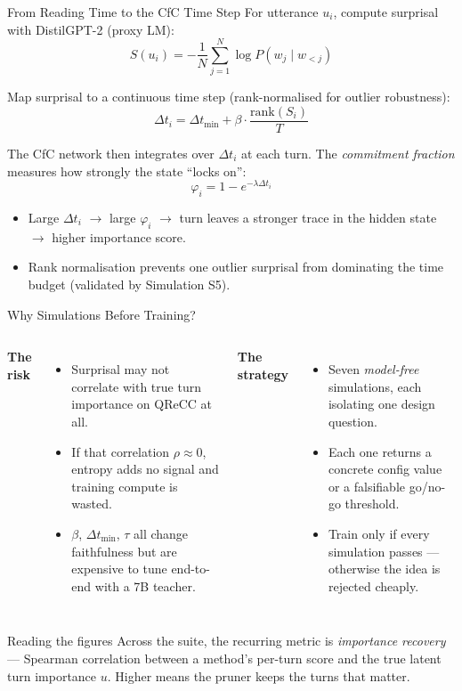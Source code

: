 \documentclass[aspectratio=169,11pt]{beamer}
\begin{document}
\begin{frame}{From Reading Time to the CfC Time Step}
  \small
  For utterance $u_i$, compute surprisal with DistilGPT-2 (proxy LM):
  \[
    S(u_i) = -\frac{1}{N}\sum_{j=1}^{N}\log P(w_j \mid w_{<j})
  \]

  Map surprisal to a continuous time step (rank-normalised for outlier robustness):
  \[
    \Delta t_i = \Delta t_{\min} + \beta \cdot \frac{\text{rank}(S_i)}{T}
  \]

  The CfC network then integrates over $\Delta t_i$ at each turn.
  The \emph{commitment fraction} measures how strongly the state ``locks on'':
  \[
    \varphi_i = 1 - e^{-\lambda \Delta t_i}
  \]

  \begin{itemize}
    \item Large $\Delta t_i$ $\rightarrow$ large $\varphi_i$ $\rightarrow$ turn leaves a stronger trace in the hidden state $\rightarrow$ higher importance score.
    \item Rank normalisation prevents one outlier surprisal from dominating the time budget (validated by Simulation S5).
  \end{itemize}
\end{frame}

\begin{frame}{Why Simulations Before Training?}
  \begin{columns}[T,onlytextwidth]
    \textbf{The risk}
    \begin{itemize}
      \item Surprisal may not correlate with true turn importance on QReCC at all.
      \item If that correlation $\rho \approx 0$, entropy adds no signal and training compute is wasted.
      \item $\beta$, $\Delta t_{\min}$, $\tau$ all change faithfulness but are expensive to tune end-to-end with a 7B teacher.
    \end{itemize}

    \textbf{The strategy}
    \begin{itemize}
      \item Seven \emph{model-free} simulations, each isolating one design question.
      \item Each one returns a concrete config value or a falsifiable go/no-go threshold.
      \item Train only if every simulation passes --- otherwise the idea is rejected cheaply.
    \end{itemize}
  \end{columns}

  \vspace{0.6em}
  \begin{block}{Reading the figures}
    Across the suite, the recurring metric is \emph{importance recovery} ---
    Spearman correlation between a method's per-turn score and the true latent
    turn importance $u$. Higher means the pruner keeps the turns that matter.
  \end{block}
\end{frame}
\end{document}
